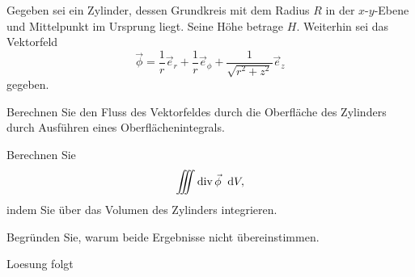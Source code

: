 \documentclass{atistandalonetask}
\begin{document}
  \begin{atiTask}[
    title = Fluss durch einen Zylinder
  ]
  
 Gegeben sei ein Zylinder, dessen Grundkreis mit dem Radius $R$ in der $x$-$y$-Ebene und Mittelpunkt im Ursprung liegt. Seine Höhe betrage $H$. Weiterhin sei das Vektorfeld
 \begin{equation*}
 \vec{\phi}=\frac{1}{r}\vec{e}_r+\frac{1}{r}\vec{e}_\phi+\frac{1}{\sqrt{r^2+z^2}}\vec{e}_z
 \end{equation*}
 gegeben.
 \begin{atiSubtasks}
 \item Berechnen Sie den Fluss des Vektorfeldes durch die Oberfläche des Zylinders durch Ausführen eines Oberflächenintegrals.
 \item Berechnen Sie
 \[
 \iiint \operatorname{div} \vec{\phi}\;\;\mathrm{d} V,
 \]
 indem Sie über das Volumen des Zylinders integrieren.
 \item Begründen Sie, warum beide Ergebnisse nicht übereinstimmen.
 \end{atiSubtasks}

  \end{atiTask}
  \begin{atiSolution}
Loesung folgt
  \end{atiSolution}
\end{document}
